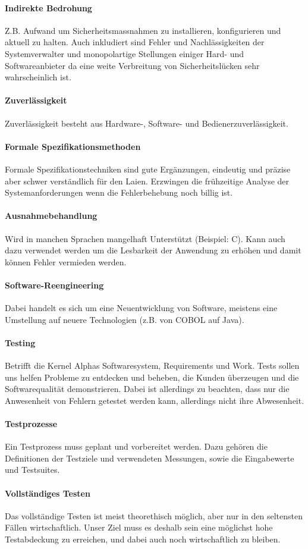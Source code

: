 \paragraph{Indirekte Bedrohung}
Z.B. Aufwand um Sicherheitsmassnahmen zu installieren, konfigurieren und aktuell zu halten. Auch inkludiert sind Fehler und Nachlässigkeiten der Systemverwalter und monopolartige Stellungen einiger Hard- und Softwareanbieter da eine weite Verbreitung von Sicherheitslücken sehr wahrscheinlich ist.
\paragraph{Zuverlässigkeit}
Zuverlässigkeit besteht aus Hardware-, Software- und Bedienerzuverlässigkeit.
\paragraph{Formale Spezifikationsmethoden}
Formale Spezifikationstechniken sind gute Ergänzungen, eindeutig und präzise
aber schwer verständlich für den Laien. Erzwingen die frühzeitige Analyse der Systemanforderungen wenn die Fehlerbehebung noch billig ist.
\paragraph{Ausnahmebehandlung}
Wird in manchen Sprachen mangelhaft Unterstützt (Beispiel: C). Kann auch dazu verwendet werden um die Lesbarkeit der Anwendung zu erhöhen und damit können Fehler vermieden werden.
\paragraph{Software-Reengineering}
Dabei handelt es sich um eine Neuentwicklung von Software, meistens eine Umstellung auf neuere Technologien (z.B. von COBOL auf Java).
\paragraph{Testing}
Betrifft die Kernel Alphas Softwaresystem, Requirements und Work. Tests sollen uns helfen Probleme zu entdecken und beheben, die Kunden überzeugen und die Softwarequalität demonstrieren. Dabei ist allerdings zu beachten, dass nur die Anwesenheit von Fehlern getestet werden kann, allerdings nicht ihre Abwesenheit.
\paragraph{Testprozesse}
Ein Testprozess muss geplant und vorbereitet werden. Dazu gehören die Definitionen der Testziele und verwendeten Messungen, sowie die Eingabewerte und Testsuites.
\paragraph{Vollständiges Testen}
Das vollständige Testen ist meist theorethisch möglich, aber nur in den seltensten Fällen wirtschaftlich. Unser Ziel muss es deshalb sein eine möglichst hohe Testabdeckung zu erreichen, und dabei auch noch wirtschaftlich zu bleiben.